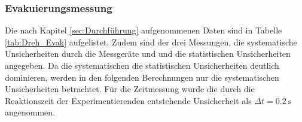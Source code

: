 \subsubsection{Evakuierungsmessung}
Die nach Kapitel \ref{sec:Durchführung} aufgenommenen Daten sind in Tabelle \ref{tab:Dreh_Evak}
aufgelistet. Zudem sind der drei Messungen, die systematische Unsicherheiten durch die 
Messgeräte und und die statistischen Unsicherheiten angegeben. Da die systematischen
die statistischen Unsicherheiten deutlich dominieren, werden in den folgenden Berechnungen
nur die systematischen Unsicherheiten betrachtet. Für die Zeitmessung wurde die durch die 
Reaktionszeit der Experimentierenden entstehende Unsicherheit als $\Delta t=\SI{0.2}{\second}$
angenommen.
